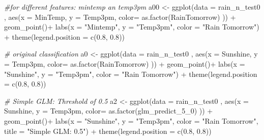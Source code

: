 \documentclass[
]{article}
\newenvironment{Shaded}{\begin{snugshade}}{\end{snugshade}}
\newcommand{\AttributeTok}[1]{\textcolor[rgb]{0.77,0.63,0.00}{#1}}
\newcommand{\CommentTok}[1]{\textcolor[rgb]{0.56,0.35,0.01}{\textit{#1}}}
\newcommand{\FloatTok}[1]{\textcolor[rgb]{0.00,0.00,0.81}{#1}}
\newcommand{\FunctionTok}[1]{\textcolor[rgb]{0.00,0.00,0.00}{#1}}
\newcommand{\NormalTok}[1]{#1}
\newcommand{\OtherTok}[1]{\textcolor[rgb]{0.56,0.35,0.01}{#1}}
\newcommand{\SpecialCharTok}[1]{\textcolor[rgb]{0.00,0.00,0.00}{#1}}
\newcommand{\StringTok}[1]{\textcolor[rgb]{0.31,0.60,0.02}{#1}}
\begin{document}
\begin{Shaded}
\begin{Highlighting}[]
\CommentTok{\#for different features: mintemp an temp3pm}
\NormalTok{a00 }\OtherTok{\textless{}{-}} \FunctionTok{ggplot}\NormalTok{(}\AttributeTok{data =}\NormalTok{ rain\_n\_test0 , }\FunctionTok{aes}\NormalTok{(}\AttributeTok{x =}\NormalTok{ MinTemp,}
\AttributeTok{y =}\NormalTok{ Temp3pm,}
\AttributeTok{color=} \FunctionTok{as.factor}\NormalTok{(RainTomorrow) )) }\SpecialCharTok{+}
\FunctionTok{geom\_point}\NormalTok{()}\SpecialCharTok{+}
\FunctionTok{labs}\NormalTok{(}\AttributeTok{x =} \StringTok{"Mintemp"}\NormalTok{,}
\AttributeTok{y =} \StringTok{"Temp3pm"}\NormalTok{,}
\AttributeTok{color =} \StringTok{"Rain Tomorrow"}\NormalTok{) }\SpecialCharTok{+}
\FunctionTok{theme}\NormalTok{(}\AttributeTok{legend.position =} \FunctionTok{c}\NormalTok{(}\FloatTok{0.8}\NormalTok{, }\FloatTok{0.8}\NormalTok{))}

\CommentTok{\# original classification }
\NormalTok{a0 }\OtherTok{\textless{}{-}} \FunctionTok{ggplot}\NormalTok{(}\AttributeTok{data =}\NormalTok{ rain\_n\_test0 , }\FunctionTok{aes}\NormalTok{(}\AttributeTok{x =}\NormalTok{ Sunshine,}
\AttributeTok{y =}\NormalTok{ Temp3pm,}
\AttributeTok{color=} \FunctionTok{as.factor}\NormalTok{(RainTomorrow) )) }\SpecialCharTok{+}
\FunctionTok{geom\_point}\NormalTok{()}\SpecialCharTok{+}
\FunctionTok{labs}\NormalTok{(}\AttributeTok{x =} \StringTok{"Sunshine"}\NormalTok{,}
\AttributeTok{y =} \StringTok{"Temp3pm"}\NormalTok{,}
\AttributeTok{color =} \StringTok{"Rain Tomorrow"}\NormalTok{) }\SpecialCharTok{+}
\FunctionTok{theme}\NormalTok{(}\AttributeTok{legend.position =} \FunctionTok{c}\NormalTok{(}\FloatTok{0.8}\NormalTok{, }\FloatTok{0.8}\NormalTok{))}

\CommentTok{\# Simple GLM: Threshold of 0.5}
\NormalTok{a2 }\OtherTok{\textless{}{-}} \FunctionTok{ggplot}\NormalTok{(}\AttributeTok{data =}\NormalTok{ rain\_n\_test0 , }\FunctionTok{aes}\NormalTok{(}\AttributeTok{x =}\NormalTok{ Sunshine,}
\AttributeTok{y =}\NormalTok{ Temp3pm,}
\AttributeTok{color=} \FunctionTok{as.factor}\NormalTok{(glm\_predict\_5\_0) )) }\SpecialCharTok{+}
\FunctionTok{geom\_point}\NormalTok{()}\SpecialCharTok{+}
\FunctionTok{labs}\NormalTok{(}\AttributeTok{x =} \StringTok{"Sunshine"}\NormalTok{,}
\AttributeTok{y =} \StringTok{"Temp3pm"}\NormalTok{,}
\AttributeTok{color =} \StringTok{"Rain Tomorrow"}\NormalTok{,}
\AttributeTok{title =} \StringTok{"Simple GLM: 0.5"}\NormalTok{) }\SpecialCharTok{+}
\FunctionTok{theme}\NormalTok{(}\AttributeTok{legend.position =} \FunctionTok{c}\NormalTok{(}\FloatTok{0.8}\NormalTok{, }\FloatTok{0.8}\NormalTok{))}


\end{Highlighting}
\end{Shaded}
\end{document}

